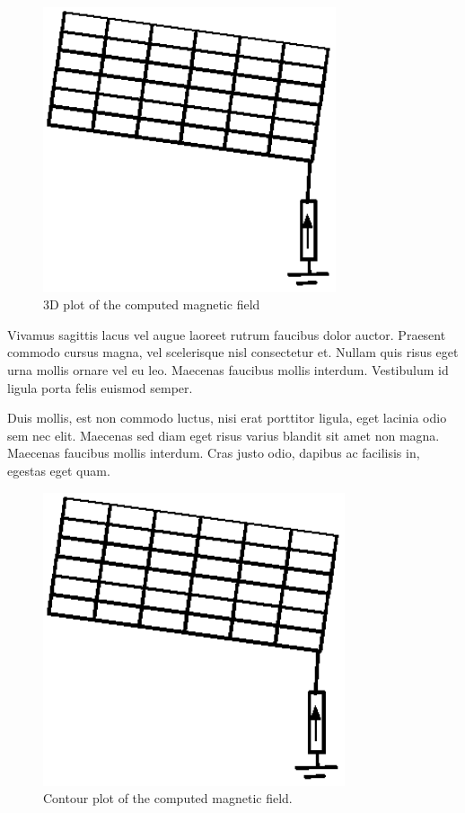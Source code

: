 \documentclass[journal]{../template/IEEEtran}
\begin{document}
\begin{figure}[!h]
	\centering
		\includegraphics[width=3.4in]{../resources/image.eps}
		\caption{3D plot of the computed magnetic field}
	    \label{fig3wq3:halfs} 
\end{figure}

Vivamus sagittis lacus vel augue laoreet rutrum faucibus dolor auctor. Praesent commodo cursus magna, vel scelerisque nisl consectetur et. Nullam quis risus eget urna mollis ornare vel eu leo. Maecenas faucibus mollis interdum. Vestibulum id ligula porta felis euismod semper.

Duis mollis, est non commodo luctus, nisi erat porttitor ligula, eget lacinia odio sem nec elit. Maecenas sed diam eget risus varius blandit sit amet non magna. Maecenas faucibus mollis interdum. Cras justo odio, dapibus ac facilisis in, egestas eget quam.
\begin{figure}[ht]
	\centering
		\includegraphics[width=3.5in]{../resources/image.eps}
		\caption{Contour plot of the computed magnetic field.}
	\label{fig:halfsp}
\end{figure}
\end{document}
